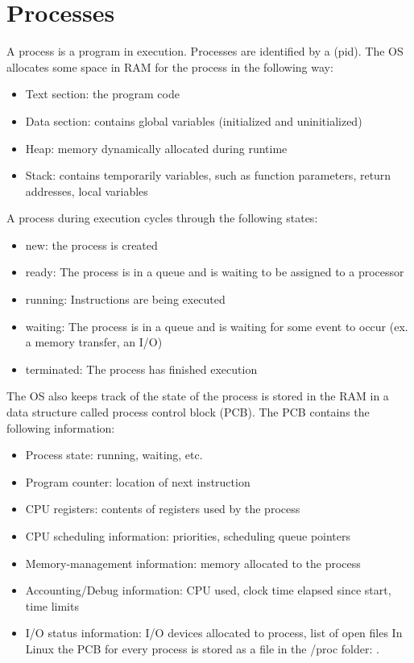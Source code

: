 \chapter{Processes}

A process is a program in execution. Processes are identified by a  (pid). The OS allocates some space in RAM for the process in the following way:

\begin{itemize}
  \item Text section: the program code
  \item Data section: contains global variables (initialized and uninitialized)
  \item Heap: memory dynamically allocated during runtime
  \item Stack: contains temporarily variables, such as function parameters, return addresses, local variables
\end{itemize}


A process during execution cycles through the following states:

\begin{itemize}
  \item new: the process is created
  \item ready: The process is in a queue and is waiting to be assigned to a processor
  \item running: Instructions are being executed
  \item waiting: The process is in a queue and is waiting for some event to occur (ex. a memory transfer, an I/O)
  \item terminated: The process has finished execution
\end{itemize}


The OS also keeps track of the state of the process is stored in the RAM in a data structure called process control block (PCB). The PCB contains the following information:

\begin{itemize}
  \item Process state: running, waiting, etc.
  \item Program counter: location of next instruction
  \item CPU registers: contents of registers used by the process
  \item CPU scheduling information: priorities, scheduling queue pointers
  \item Memory-management information: memory allocated to the process
  \item Accounting/Debug information: CPU used, clock time elapsed since start, time limits
  \item I/O status information: I/O devices allocated to process, list of open files
  In Linux the PCB for every process is stored as a file in the /proc folder: .
\end{itemize}


